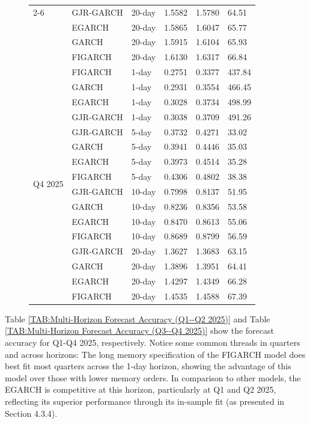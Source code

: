 \begin{figure}[h]
\begin{minipage}{0.48\textwidth}
{\begin{tabular}{|l|l|l|l|l|l|}
\cline{2-6}
 & GJR-GARCH   & 20-day & 1.5582 & 1.5780 & 64.51 \\
 & EGARCH      & 20-day & 1.5865 & 1.6047 & 65.77 \\
 & GARCH       & 20-day & 1.5915 & 1.6104 & 65.93 \\
 & FIGARCH & 20-day & 1.6130 & 1.6317 & 66.84 \\
\hline
\multirow{16}{*}{Q4 2025}
 & FIGARCH & 1-day  & 0.2751 & 0.3377 & 437.84 \\
 & GARCH       & 1-day  & 0.2931 & 0.3554 & 466.45 \\
 & EGARCH      & 1-day  & 0.3028 & 0.3734 & 498.99 \\
 & GJR-GARCH   & 1-day  & 0.3038 & 0.3709 & 491.26 \\
\cline{2-6}
 & GJR-GARCH   & 5-day  & 0.3732 & 0.4271 & 33.02 \\
 & GARCH       & 5-day  & 0.3941 & 0.4446 & 35.03 \\
 & EGARCH      & 5-day  & 0.3973 & 0.4514 & 35.28 \\
 & FIGARCH & 5-day  & 0.4306 & 0.4802 & 38.38 \\
\cline{2-6}
 & GJR-GARCH   & 10-day & 0.7998 & 0.8137 & 51.95 \\
 & GARCH       & 10-day & 0.8236 & 0.8356 & 53.58 \\
 & EGARCH      & 10-day & 0.8470 & 0.8613 & 55.06 \\
 & FIGARCH & 10-day & 0.8689 & 0.8799 & 56.59 \\
\cline{2-6}
 & GJR-GARCH   & 20-day & 1.3627 & 1.3683 & 63.15 \\
 & GARCH       & 20-day & 1.3896 & 1.3951 & 64.41 \\
 & EGARCH      & 20-day & 1.4297 & 1.4349 & 66.28 \\
 & FIGARCH & 20-day & 1.4535 & 1.4588 & 67.39 \\
\hline
\end{tabular}
}
\end{minipage}
\end{figure}

Table \ref{TAB:Multi-Horizon Forecast Accuracy (Q1--Q2 2025)} and Table \ref{TAB:Multi-Horizon Forecast Accuracy (Q3--Q4 2025)} show the forecast accuracy for Q1-Q4 2025, respectively. Notice some common threads in quarters and across horizons:
The long memory specification of the FIGARCH model does best fit most quarters across the 1-day horizon, showing the advantage of this model over those with lower memory orders. In comparison to other models, the EGARCH is competitive at this horizon, particularly at Q1 and Q2 2025, reflecting its superior performance through its in-sample fit (as presented in Section 4.3.4).


